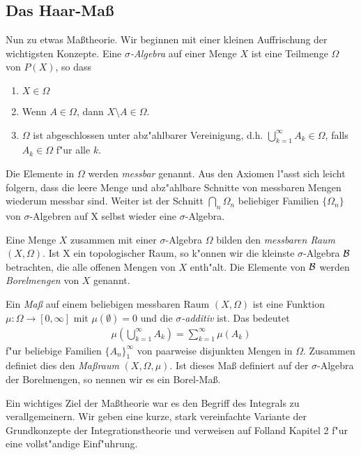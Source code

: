 \subsection{Das Haar-Maß}
	Nun zu etwas Maßtheorie. 
	Wir beginnen mit einer kleinen Auffrischung der wichtigsten Konzepte. 
	Eine \emph{$\sigma$-Algebra} auf einer Menge $X$ ist eine Teilmenge $\Omega$ von $P(X)$, so dass
	\begin{enumerate}[label=(\roman*)]
		\item $X \in \Omega$
		\item Wenn $A \in \Omega$, dann $X\setminus A \in \Omega$.
		\item $\Omega$ ist abgeschlossen unter abz"ahlbarer Vereinigung, d.h. $\bigcup_{k=1}^{\infty} A_k \in \Omega$, falls $A_k \in \Omega$ f"ur alle $k$.
	\end{enumerate}
	Die Elemente in $\Omega$ werden \emph{messbar} genannt. 
	Aus den Axiomen l"asst sich leicht folgern, dass die leere Menge und abz"ahlbare Schnitte von messbaren Mengen wiederum messbar sind. 
	Weiter ist der Schnitt $\bigcap_n \Omega_n$ beliebiger Familien $\{\Omega_n\}$ von $\sigma$-Algebren auf X selbst wieder eine $\sigma$-Algebra.
	
	Eine Menge $X$ zusammen mit einer $\sigma$-Algebra $\Omega$ bilden den \emph{messbaren Raum} $(X, \Omega)$. 
	Ist X ein topologischer Raum, so k"onnen wir die kleinste $\sigma$-Algebra $\mathcal{B}$ betrachten, die alle offenen Mengen von $X$ enth"alt. 
	Die Elemente von $\mathcal{B}$ werden \emph{Borelmengen} von $X$ genannt.
	
	Ein \emph{Maß} auf einem beliebigen messbaren Raum $(X, \Omega)$ ist eine Funktion $\mu: \Omega \to [0, \infty]$ mit $\mu(\emptyset) = 0$ und die \emph{$\sigma$-additiv} ist. 
	Das bedeutet
	\begin{align*}
		\mu\left( \bigcup_{k=1}^{\infty} A_k\right) = \sum_{k=1}^{\infty} \mu (A_k)
	\end{align*}
	f"ur beliebige Familien $\{A_n\}_1^\infty$ von paarweise disjunkten Mengen in $\Omega$.
	Zusammen definiet dies den \emph{Maßraum} $(X, \Omega, \mu)$.
	Ist dieses Maß definiert auf der $\sigma$-Algebra der Borelmengen, so nennen wir es ein Borel-Maß.
	
	Ein wichtiges Ziel der Maßtheorie war es den Begriff des Integrals zu verallgemeinern.
	Wir geben eine kurze, stark vereinfachte Variante der Grundkonzepte der Integrationstheorie und verweisen auf Folland \cite{folland} Kapitel 2 f"ur eine vollst"andige Einf"uhrung.
	
